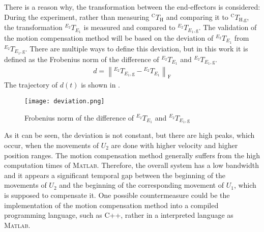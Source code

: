 There is a reason why, the transformation between the end-effectors is considered: During the experiment, rather than measuring $^{\text{C}}T_{\text{H}}$ and comparing it to $^{\text{C}}T_{\text{H,g}}$, the transformation $^{E_{2}}T_{E_{1}}$ is measured and compared to $^{E_{2}}T_{E_{1},\text{g}}$. The validation of the motion compensation method will be based on the deviation of $^{E_{2}}T_{E_{1}}$ from $^{E_{2}}T_{E_{1},\text{g}}$. There are multiple ways to define this deviation, but in this work it is defined as the Frobenius norm of the difference of $^{E_{2}}T_{E_{1}}$ and $^{E_{2}}T_{E_{1},\text{g}}$.
\begin{align}
d = \left \| {^{E_{2}}T_{E_{1},\text{g}}} - {^{E_{2}}T_{E_{1}}}  \right \|_{\text{F}}
\end{align}
The trajectory of $d(t)$ is shown in .
\begin{figure}[!t]
\centering
\texttt{[image: deviation.png]}
\caption{Frobenius norm of the difference of $^{E_{2}}T_{E_{1}}$ and $^{E_{2}}T_{E_{1},\text{g}}$}
\label{fig:deviation}
\end{figure}
As it can be seen, the deviation is not constant, but there are high peaks, which occur, when the movements of $U_{2}$ are done with higher velocity and higher position ranges. The motion compensation method generally suffers from the high computation times of \textsc{Matlab}. Therefore, the overall system has a low bandwidth and it appears a significant temporal gap between the beginning of the movements of $U_{2}$ and the beginning of the corresponding movement of $U_{1}$, which is supposed to compensate it. One possible countermeasure could be the implementation of the motion compensation method into a compiled programming language, such as C++, rather in a interpreted language as \textsc{Matlab}. 